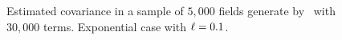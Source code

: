 \begin{figure}[H]
 \centering
 \caption{Estimated covariance in a sample of $5,000$ fields generate by \kle\ with $30,000$ terms. Exponential case with $\ell = 0.1$.}
 \label{covar_expKL1}
\end{figure}

